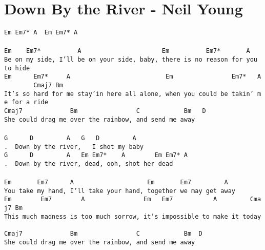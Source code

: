 \newpage
\section{Down By the River - Neil Young}
\label{Down By the River - Neil Young}
\texttt{Em\ Em7*\ A\ \ Em\ Em7*\ A\ \\
\\
Em\ \ \ \ Em7*\ \ \ \ \ \ \ \ \ \ A\ \ \ \ \ \ \ \ \ \ \ \ \ \ \ \ \ \ \ \ \ \ Em\ \ \ \ \ \ \ \ \ \ Em7*\ \ \ \ \ \ \ A\\
Be\ on\ my\ side,\ I'll\ be\ on\ your\ side,\ baby,\ there\ is\ no\ reason\ for\ you\ to\ hide\ \ \ \ \\
Em\ \ \ \ \ \ Em7*\ \ \ \ \ A\ \ \ \ \ \ \ \ \ \ \ \ \ \ \ \ \ \ \ \ \ \ \ \ \ \ Em\ \ \ \ \ \ \ \ \ \ \ \ \ \ \ \ Em7*\ \ \ A\ \ \ \ \ \ \ \ Cmaj7\ Bm\\
It's\ so\ hard\ for\ me\ stay'in\ here\ all\ alone,\ when\ you\ could\ be\ takin'\ me\ for\ a\ ride\ \\
Cmaj7\ \ \ \ \ \ \ \ \ \ \ \ \ Bm\ \ \ \ \ \ \ \ \ \ \ \ \ \ \ \ C\ \ \ \ \ \ \ \ \ \ \ \ Bm\ \ \ D\\
She\ could\ drag\ me\ over\ the\ rainbow,\ and\ send\ me\ away\ \\
\\
G\ \ \ \ \ \ D\ \ \ \ \ \ \ \ \ A\ \ \ G\ \ \ D\ \ \ \ \ \ \ \ \ A\\
.\ \ Down\ by\ the\ river,\ \ \ I\ shot\ my\ baby\\
G\ \ \ \ \ \ D\ \ \ \ \ \ \ \ \ A\ \ \ Em\ Em7*\ \ \ \ A\ \ \ \ \ \ \ \ Em\ Em7*\ A\\
.\ \ Down\ by\ the\ river,\ dead,\ ooh,\ shot\ her\ dead\\
\\
Em\ \ \ \ \ \ \ Em7\ \ \ \ \ \ A\ \ \ \ \ \ \ \ \ \ \ \ \ \ \ \ \ \ \ \ Em\ \ \ \ \ \ \ Em7\ \ \ \ \ \ \ \ \ A\\
You\ take\ my\ hand,\ I'll\ take\ your\ hand,\ together\ we\ may\ get\ away\ \ \\
Em\ \ \ \ \ \ \ \ Em7\ \ \ \ \ \ \ \ A\ \ \ \ \ \ \ \ \ \ \ \ \ \ \ \ Em\ \ \ Em7\ \ \ \ \ \ \ \ \ \ \ A\ \ \ \ \ \ \ \ \ Cmaj7\ Bm\\
This\ much\ madness\ is\ too\ much\ sorrow,\ it's\ impossible\ to\ make\ it\ today\ \\
Cmaj7\ \ \ \ \ \ \ \ \ \ \ \ \ Bm\ \ \ \ \ \ \ \ \ \ \ \ \ \ \ \ C\ \ \ \ \ \ \ \ \ \ \ \ Bm\ \ D\\
She\ could\ drag\ me\ over\ the\ rainbow,\ and\ send\ me\ away\ \ \ \\
}
